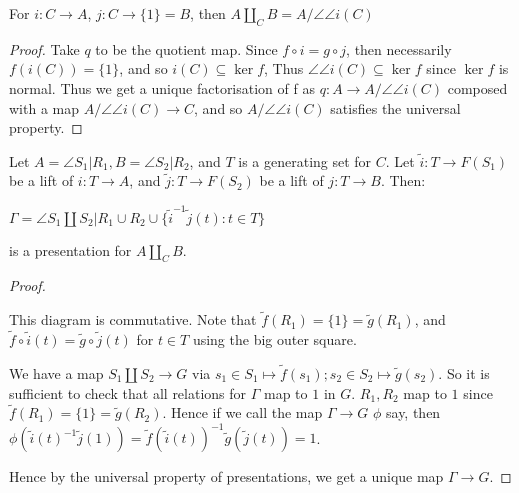 \documentclass[10pt,a4paper]{article}
\begin{document}
\begin{lemma}
For $i:C\to A$, $j:C \to \{1\}=B$, then $A \coprod_C B = A/\angle{\angle{i(C)}}$
\end{lemma}
\begin{proof}
Take $q$ to be the quotient map. Since $f \circ i = g \circ j$, then necessarily $f(i(C)) = \{1\}$, and so $i(C) \subseteq \ker f$, Thus $\angle{\angle{i(C)}} \subseteq \ker f$ since $\ker f$ is normal. Thus we get a unique factorisation of f as $q: A \to A/\angle{\angle{i(C)}}$ composed with a map $A/\angle{\angle{i(C)}} \to C$, and so $A/\angle{\angle{i(C)}}$ satisfies the universal property.
\end{proof}
\begin{lemma}
Let $A = \angle{S_1|R_1}, B = \angle{S_2|R_2}$, and $T$ is a generating set for $C$. Let $\tilde{i}:T \to F(S_1)$ be a lift of $i:T\to A$, and $\tilde{j} :T\to F(S_2)$ be a lift of $j:T \to B$. Then:
\begin{center}
$\Gamma = \angle{S_1 \coprod S_2 | R_1 \cup R_2 \cup \{\tilde{i}^{-1}\tilde{j}(t) : t \in T\}}$
\end{center}
is a presentation for $A \coprod_C B$.
\end{lemma}
\begin{proof}\item
\begin{center}
\end{center}
This diagram is commutative. Note that $\tilde{f}(R_1) = \{1\} = \tilde{g}(R_1)$, and $\tilde{f}\circ \tilde{i} (t) = \tilde{g}\circ\tilde{j}(t)$ for $t \in T$ using the big outer square.

We have a map $S_1 \coprod S_2 \to G$ via $s_1 \in S_1 \mapsto \tilde{f}(s_1); s_2 \in S_2 \mapsto \tilde{g}(s_2)$. So it is sufficient to check that all relations for $\Gamma$ map to $1$ in $G$. $R_1, R_2$ map to $1$ since $\tilde{f}(R_1) = \{1\} = \tilde{g}(R_2)$. Hence if we call the map $\Gamma \to G$ $\phi$ say, then $\phi(\tilde{i}(t)^{-1}\tilde{j}(1)) = \tilde{f}(\tilde{i}(t))^{-1} \tilde{g}(\tilde{j}(t)) = 1$.

Hence by the universal property of presentations, we get a unique map $\Gamma \to G$.
\end{proof}
\end{document}
